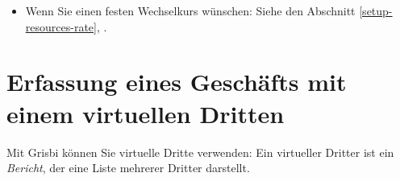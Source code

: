 \begin{itemize}
	\item Wenn Sie einen festen Wechselkurs wünschen: Siehe den Abschnitt \vref{setup-resources-rate}, .
\end{itemize}


\section{Erfassung eines Geschäfts mit einem virtuellen Dritten\label{transactions-virtualThird}}

Mit Grisbi können Sie virtuelle Dritte verwenden: Ein virtueller Dritter ist ein \emph{Bericht}, der eine Liste mehrerer Dritter darstellt.

